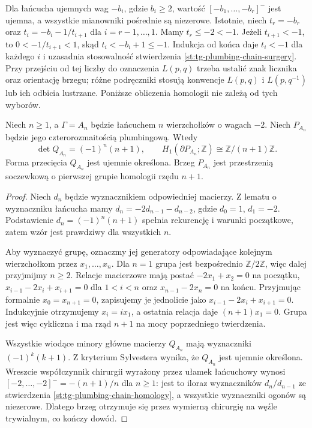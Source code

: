 \begin{uwaga}
Dla łańcucha ujemnych wag $-b_i$, gdzie $b_i\ge2$,
wartość $[-b_1,\dots,-b_r]^-$ jest ujemna,
a wszystkie mianowniki pośrednie są niezerowe.
Istotnie, niech $t_r=-b_r$ oraz
$t_i=-b_i-1/t_{i+1}$ dla $i=r-1,\dots,1$.
Mamy $t_r\le -2<-1$. Jeżeli $t_{i+1}<-1$,
to $0<-1/t_{i+1}<1$, skąd
$t_i<-b_i+1\le-1$. Indukcja od końca
daje $t_i<-1$ dla każdego $i$ i uzasadnia
stosowalność stwierdzenia
\ref{st:tg-plumbing-chain-surgery}.
Przy przejściu od tej liczby do oznaczenia $L(p,q)$
trzeba ustalić znak licznika oraz orientację brzegu;
różne podręczniki stosują konwencje $L(p,q)$ i
$L(p,q^{-1})$ lub ich odbicia lustrzane.
Poniższe obliczenia homologii nie zależą od tych wyborów.
\end{uwaga}

\begin{twierdzenie}
\label{thm:tg-plumbing-An}
Niech $n\ge1$, a $\Gamma=A_n$ będzie łańcuchem
$n$ wierzchołków o wagach $-2$. Niech $P_{A_n}$
będzie jego czterorozmaitością plumbingową. Wtedy
\[
\det Q_{A_n}=(-1)^n(n+1),\qquad
H_1(\partial P_{A_n};\mathbb Z)\cong\mathbb Z/(n+1)\mathbb Z.
\]
Forma przecięcia $Q_{A_n}$ jest ujemnie określona.
Brzeg $P_{A_n}$ jest przestrzenią soczewkową o pierwszej
grupie homologii rzędu $n+1$.
\end{twierdzenie}
\begin{proof}
Niech $d_n$ będzie wyznacznikiem odpowiedniej macierzy.
Z lematu o wyznaczniku łańcucha mamy
$d_n=-2d_{n-1}-d_{n-2}$, gdzie $d_0=1$, $d_1=-2$.
Podstawienie $d_n=(-1)^n(n+1)$ spełnia rekurencję
i warunki początkowe, zatem wzór jest prawdziwy dla
wszystkich $n$.

Aby wyznaczyć grupę, oznaczmy jej generatory odpowiadające
kolejnym wierzchołkom przez $x_1,\dots,x_n$. Dla $n=1$ grupa jest bezpośrednio
$\mathbb Z/2\mathbb Z$, więc dalej przyjmijmy $n\ge2$.
Relacje
macierzowe mają postać
$-2x_1+x_2=0$ na początku,
$x_{i-1}-2x_i+x_{i+1}=0$ dla $1<i<n$ oraz
$x_{n-1}-2x_n=0$ na końcu.
Przyjmując formalnie $x_0=x_{n+1}=0$, zapisujemy je
jednolicie jako $x_{i-1}-2x_i+x_{i+1}=0$.
Indukcyjnie otrzymujemy $x_i=i x_1$, a ostatnia relacja
daje $(n+1)x_1=0$. Grupa jest więc cykliczna i ma
rząd $n+1$ na mocy poprzedniego twierdzenia.

Wszystkie wiodące minory główne macierzy $Q_{A_n}$
mają wyznaczniki $(-1)^k(k+1)$. Z kryterium Sylvestera
wynika, że $Q_{A_n}$ jest ujemnie określona.
Wreszcie współczynnik chirurgii wyrażony przez ułamek
łańcuchowy wynosi
$[-2,\dots,-2]^-=-(n+1)/n$ dla $n\ge1$:
jest to iloraz wyznaczników $d_n/d_{n-1}$
ze stwierdzenia \ref{st:tg-plumbing-chain-homology},
a wszystkie wyznaczniki ogonów są niezerowe.
Dlatego brzeg otrzymuje się przez wymierną chirurgię
na węźle trywialnym, co kończy dowód.
\end{proof}

